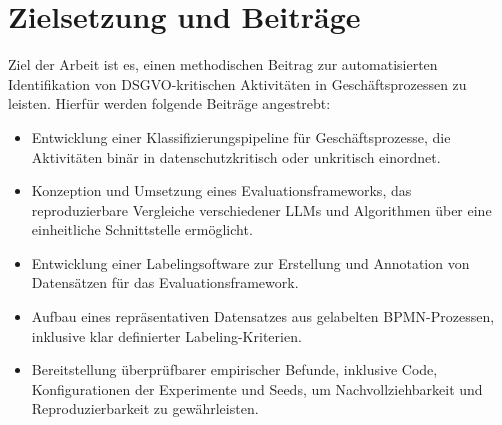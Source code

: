 \section{Zielsetzung und Beiträge}\label{sec:zielsetzung-und-beitrage}

Ziel der Arbeit ist es, einen methodischen Beitrag zur automatisierten Identifikation von \ac{DSGVO}-kritischen Aktivitäten in Geschäftsprozessen zu leisten. Hierfür werden folgende Beiträge angestrebt:

\begin{itemize}
    \item Entwicklung einer Klassifizierungspipeline für Geschäftsprozesse, die Aktivitäten binär in datenschutzkritisch oder unkritisch einordnet.
    \item Konzeption und Umsetzung eines Evaluationsframeworks, das reproduzierbare Vergleiche verschiedener \acp{LLM} und Algorithmen über eine einheitliche Schnittstelle ermöglicht.
    \item Entwicklung einer Labelingsoftware zur Erstellung und Annotation von Datensätzen für das Evaluationsframework.
    \item Aufbau eines repräsentativen Datensatzes aus gelabelten \ac{BPMN}-Prozessen, inklusive klar definierter Labeling-Kriterien.
    \item Bereitstellung überprüfbarer empirischer Befunde, inklusive Code, Konfigurationen der Experimente und Seeds, um Nachvollziehbarkeit und Reproduzierbarkeit zu gewährleisten.
\end{itemize}